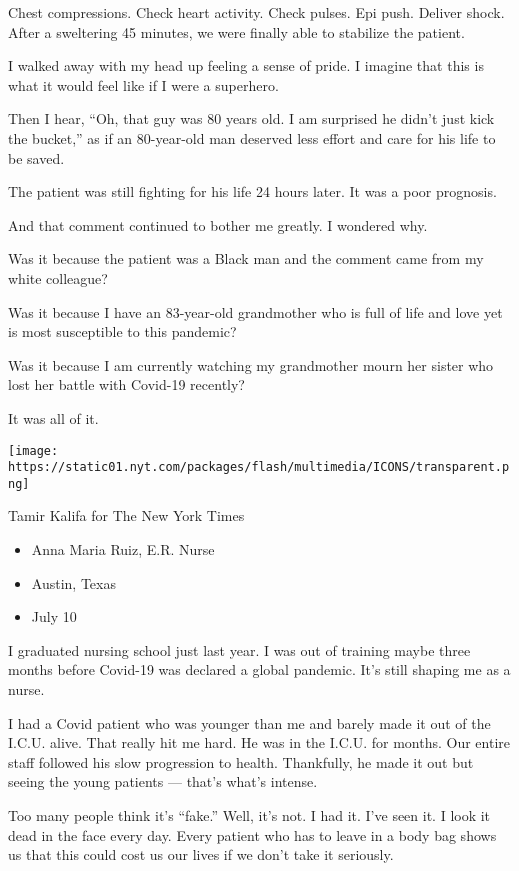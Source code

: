 Chest compressions. Check heart activity. Check pulses. Epi push.
Deliver shock. After a sweltering 45 minutes, we were finally able to
stabilize the patient.

I walked away with my head up feeling a sense of pride. I imagine that
this is what it would feel like if I were a superhero.

Then I hear, ``Oh, that guy was 80 years old. I am surprised he didn't
just kick the bucket,'' as if an 80-year-old man deserved less effort
and care for his life to be saved.

The patient was still fighting for his life 24 hours later. It was a
poor prognosis.

And that comment continued to bother me greatly. I wondered why.

Was it because the patient was a Black man and the comment came from my
white colleague?

Was it because I have an 83-year-old grandmother who is full of life and
love yet is most susceptible to this pandemic?

Was it because I am currently watching my grandmother mourn her sister
who lost her battle with Covid-19 recently?

It was all of it.

\texttt{[image: https://static01.nyt.com/packages/flash/multimedia/ICONS/transparent.png]}

Tamir Kalifa for The New York Times

\begin{itemize}
\tightlist
\item
  Anna Maria Ruiz, E.R. Nurse
\item
  Austin, Texas
\item
  July 10
\end{itemize}

I graduated nursing school just last year. I was out of training maybe
three months before Covid-19 was declared a global pandemic. It's still
shaping me as a nurse.

I had a Covid patient who was younger than me and barely made it out of
the I.C.U. alive. That really hit me hard. He was in the I.C.U. for
months. Our entire staff followed his slow progression to health.
Thankfully, he made it out but seeing the young patients --- that's
what's intense.

Too many people think it's ``fake.'' Well, it's not. I had it. I've seen
it. I look it dead in the face every day. Every patient who has to leave
in a body bag shows us that this could cost us our lives if we don't
take it seriously.


